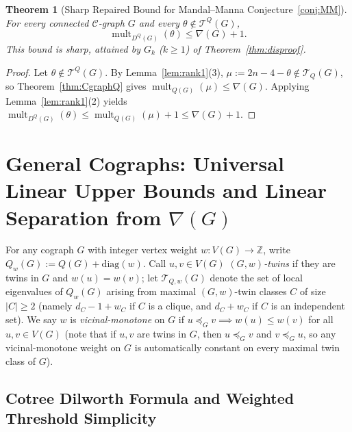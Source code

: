 \documentclass[11pt,a4paper]{article}
\newtheorem{theorem}{Theorem}[section]
\theoremstyle{definition}
\DeclareMathOperator{\mult}{mult}
\begin{document}
\begin{theorem}[Sharp Repaired Bound for Mandal--Manna Conjecture~\ref{conj:MM}]\label{thm:CgraphDQ}
  For every connected $\mathcal{C}$-graph $G$ and every $\theta \notin \mathcal{T}^Q(G)$,
  \[
    \mult_{D^Q(G)}(\theta) \le \nabla(G) + 1.
  \]
  This bound is sharp, attained by $G_k$ ($k \ge 1$) of Theorem~\ref{thm:disproof}.
\end{theorem}

\begin{proof}
  Let $\theta \notin \mathcal{T}^Q(G)$. By Lemma~\ref{lem:rank1}(3), $\mu := 2n - 4 - \theta \notin \mathcal{T}_Q(G)$, so Theorem~\ref{thm:CgraphQ} gives $\mult_{Q(G)}(\mu) \le \nabla(G)$. Applying Lemma~\ref{lem:rank1}(2) yields $\mult_{D^Q(G)}(\theta) \le \mult_{Q(G)}(\mu) + 1 \le \nabla(G) + 1$.
\end{proof}

\section{General Cographs: Universal Linear Upper Bounds and Linear Separation from $\nabla(G)$}\label{sec:cographs}

For any cograph $G$ with integer vertex weight $w : V(G) \to \mathbb{Z}$, write $Q_w(G) := Q(G) + \mathrm{diag}(w)$. Call $u, v \in V(G)$ \emph{$(G,w)$-twins} if they are twins in $G$ and $w(u) = w(v)$; let $\mathcal{T}_{Q,w}(G)$ denote the set of local eigenvalues of $Q_w(G)$ arising from maximal $(G,w)$-twin classes $C$ of size $|C| \ge 2$ (namely $d_C - 1 + w_C$ if $C$ is a clique, and $d_C + w_C$ if $C$ is an independent set). We say $w$ is \emph{vicinal-monotone} on $G$ if $u \preceq_G v \implies w(u) \le w(v)$ for all $u, v \in V(G)$ (note that if $u, v$ are twins in $G$, then $u \preceq_G v$ and $v \preceq_G u$, so any vicinal-monotone weight on $G$ is automatically constant on every maximal twin class of $G$).

\subsection{Cotree Dilworth Formula and Weighted Threshold Simplicity}
\end{document}
